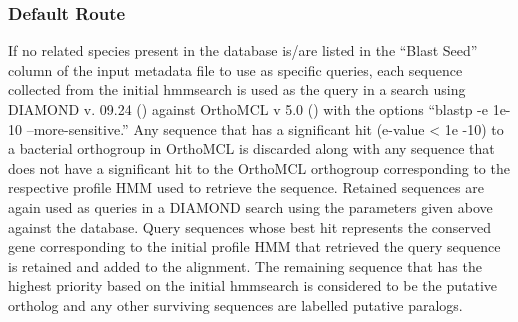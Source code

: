 \documentclass{article}
\begin{document}
            \subsubsection{Default Route}
                If no related species present in the database is/are listed in the “Blast Seed” column of the input metadata file to use as specific queries, each sequence collected from the initial hmmsearch is used as the query in a search using DIAMOND v. 09.24 (\cite{buchfink_fast_2015}) against OrthoMCL v 5.0 (\cite{chen_orthomcl-db_2006}) with the options “blastp -e 1e-10 --more-sensitive.” Any sequence that has a significant hit (e-value < 1e -10) to a bacterial orthogroup in OrthoMCL is discarded along with any sequence that does not have a significant hit to the OrthoMCL orthogroup corresponding to the respective profile HMM used to retrieve the sequence. Retained sequences are again used as queries in a DIAMOND search using the parameters given above against the database. Query sequences whose best hit represents the conserved gene corresponding to the initial profile HMM that retrieved the query sequence is retained and added to the alignment. The remaining sequence that has the highest priority based on the initial hmmsearch is considered to be the putative ortholog and any other surviving sequences are labelled putative paralogs.
                
\end{document}
